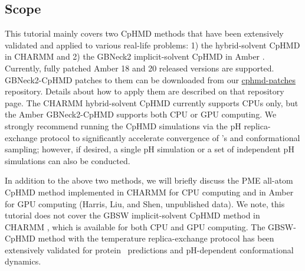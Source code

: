 \subsection{Scope} %
This tutorial mainly covers two CpHMD methods that
have been extensively validated and applied to various real-life problems:
1) the hybrid-solvent CpHMD \cite{Wallace_Shen_2011_J.Chem.TheoryComput.}
in CHARMM \cite{Brooks_Karplus_2009_J.Comput.Chem.}
and
2) the GBNeck2 implicit-solvent CpHMD
\cite{Huang_Shen_2018_J.Chem.Inf.Model.,Harris_Shen_2019_J.Chem.Inf.Model.}
in Amber \cite{Case_Kollman_2018_}. Currently, fully patched Amber 18 and 20 released versions are supported. GBNeck2-CpHMD patches to them can be downloaded from our \href{https://gitlab.com/shenlab-amber-cphmd/cphmd-patches}{cphmd-patches} repository. Details about how to apply them are described on that repository page.
The CHARMM hybrid-solvent CpHMD currently supports CPUs only, 
but the Amber GBNeck2-CpHMD supports both CPU or GPU computing.
We strongly recommend running the CpHMD simulations
via the pH replica-exchange protocol to significantly accelerate convergence of \pka's and conformational sampling; however, if desired, a single pH 
simulation or a set of independent pH simulations can also 
be conducted.

In addition to the above two methods, we will briefly
discuss the PME all-atom CpHMD method implemented in
CHARMM for CPU computing \cite{Huang_Shen_2016_J.Chem.TheoryComput.}
and in Amber for GPU computing (Harris, Liu, and Shen, unpublished data). 
We note, this tutorial does not cover the GBSW implicit-solvent CpHMD method in CHARMM 
\cite{Lee_Brooks_2004_Proteins,Khandogin_Brooks_2005_Biophys.J.,Khandogin_Brooks_2006_Biochemistry,Arthur_Brooks_2016_J.Comput.Chem.a}, which is available for both CPU and GPU computing.
The GBSW-CpHMD method with the temperature replica-exchange protocol has been extensively validated for protein \pka\ 
predictions and pH-dependent conformational dynamics.
